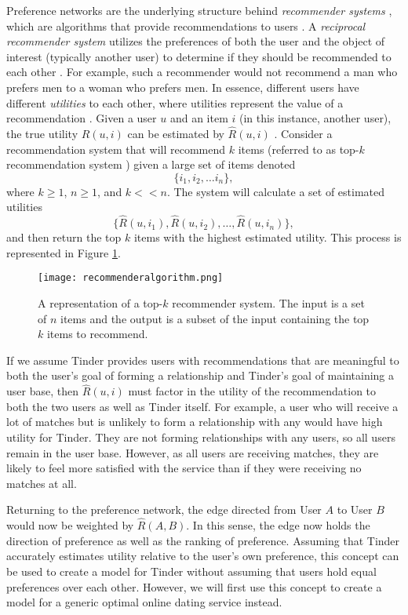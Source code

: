 Preference networks are the underlying structure behind \textit{recommender systems} \citep{Newman2003}, which are algorithms that provide recommendations to users \citep{Andrews2015}. A \textit{reciprocal recommender system} utilizes the preferences of both the user and the object of interest (typically another user) to determine if they should be recommended to each other \citep{Andrews2015}. For example, such a recommender would not recommend a man who prefers men to a woman who prefers men. In essence, different users have different \emph{utilities} to each other, where utilities represent the value of a recommendation \citep{Andrews2015}. Given a user $u$ and an item $i$ (in this instance, another user), the true utility $R(u, i)$ can be estimated by $\hat{R}(u, i)$ \citep{Andrews2015}. Consider a recommendation system that will recommend $k$ items (referred to as top-$k$ recommendation system \citep{Andrews2015}) given a large set of items denoted 
\begin{equation*}
    \{i_{1}, i_{2}, \ldots i_{n}\}, 
\end{equation*}
where $k \geq 1$, $n \geq 1$, and $k << n$. The system will calculate a set of estimated utilities
\begin{equation*}
    \{\hat{R}(u, i_{1}), \hat{R}(u, i_{2}), \ldots, \hat{R}(u, i_{n})\} ,
\end{equation*}
and then return the top $k$ items with the highest estimated utility. This process is represented in Figure \ref{fig:recalgorithm}.

\begin{figure}[t]
    \centering
    \texttt{[image: recommenderalgorithm.png]}
    \caption{A representation of a top-$k$ recommender system. The input is a set of $n$ items and the output is a subset of the input containing the top $k$ items to recommend.}
    \label{fig:recalgorithm}
\end{figure}

If we assume Tinder provides users with recommendations that are meaningful to both the user's goal of forming a relationship and Tinder's goal of maintaining a user base, then $\hat{R}(u, i)$ must factor in the utility of the recommendation to both the two users as well as Tinder itself. For example, a user who will receive a lot of matches but is unlikely to form a relationship with any would have high utility for Tinder. They are not forming relationships with any users, so all users remain in the user base. However, as all users are receiving matches, they are likely to feel more satisfied with the service than if they were receiving no matches at all.

Returning to the preference network, the edge directed from User $A$ to User $B$ would now be weighted by $\hat{R}(A, B)$. In this sense, the edge now holds the direction of preference as well as the ranking of preference. Assuming that Tinder accurately estimates utility relative to the user's own preference, this concept can be used to create a model for Tinder without assuming that users hold equal preferences over each other. However, we will first use this concept to create a model for a generic optimal online dating service instead.